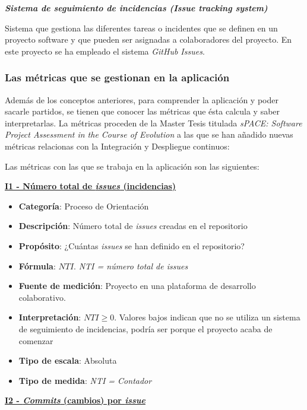 \textbf{\textit{Sistema de seguimiento de incidencias (\textit{Issue tracking system})}}

Sistema que gestiona las diferentes tareas o incidentes que se definen en un proyecto software y que pueden ser asignadas a colaboradores del proyecto. En este proyecto se ha empleado el sistema \textit{GitHub Issues}.

\subsubsection{Las métricas que se gestionan en la aplicación}

Además de los conceptos anteriores, para comprender la aplicación y poder sacarle partidos, se tienen que conocer las métricas que ésta calcula y saber interpretarlas. La métricas proceden de la Master Tesis titulada \textit{sPACE: Software Project Assessment in the Course of Evolution} \cite{ratzinger_space:_2007} a las que se han añadido nuevas métricas relacionas con la Integración y Despliegue continuos:


Las métricas con las que se trabaja en la aplicación son las siguientes:

\textbf{\underline{I1 - Número total de \textit{issues} (incidencias)}}

\begin{itemize}
	\item \textbf{Categoría}: Proceso de Orientación
	\item \textbf{Descripción}: Número total de \textit{issues} creadas en el repositorio
	\item \textbf{Propósito}: ¿Cuántas \textit{issues} se han definido en el repositorio?
	\item \textbf{Fórmula}: $NTI$. \textit{NTI = número total de \textit{issues}}
	\item \textbf{Fuente de medición}: Proyecto en una plataforma de desarrollo colaborativo.
	\item \textbf{Interpretación}: $NTI \geq 0$. Valores bajos indican que no se utiliza un sistema de seguimiento de incidencias, podría ser porque el proyecto acaba de comenzar
	\item \textbf{Tipo de escala}: Absoluta
	\item \textbf{Tipo de medida}: \textit{NTI = Contador}
\end{itemize}

\textbf{\underline{I2 - \textit{Commits} (cambios) por \textit{issue}}}

